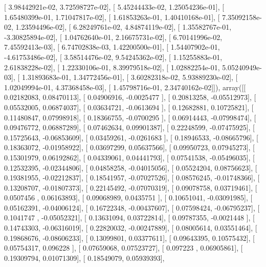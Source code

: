 \documentclass{article}
\begin{document}
       [  3.98442921e-02,   3.72598727e-02],
       [  5.45244433e-02,   1.25054236e-01],
       [  1.65480399e-01,   1.71047817e-02],
       [  1.61853263e-01,   1.40410168e-01],
       [  7.35092158e-02,   1.23594496e-02],
       [  6.28249761e-02,   4.84874119e-02],
       [  1.35582767e-01,  -3.30825894e-02],
       [  1.04762640e-01,   2.16675731e-02],
       [  6.70141996e-02,   7.45592413e-03],
       [  6.74702838e-03,   1.42200500e-01],
       [  1.54407902e-01,  -4.61753486e-02],
       [  3.58514476e-02,   9.54245362e-02],
       [  1.15255883e-01,   2.61838228e-02],
       [  1.22330106e-01,   8.39979518e-02],
       [  1.02882254e-01,   5.05240949e-03],
       [  1.31893683e-01,   1.34772456e-01],
       [  3.60282318e-02,   5.93889230e-02],
       [  1.02049994e-01,   4.37368458e-03],
       [  1.45798716e-01,   2.34740162e-02]]), array([[ 0.02182083,  0.08470113],
       [ 0.04906916, -0.0025477 ],
       [ 0.20813258, -0.05512973],
       [ 0.05532005,  0.06874037],
       [ 0.03634721, -0.0613694 ],
       [ 0.12682881,  0.10725821],
       [ 0.11480847,  0.07998918],
       [ 0.18366755, -0.0700295 ],
       [ 0.06914443, -0.07998474],
       [ 0.09476772,  0.06887289],
       [ 0.07462634,  0.09901387],
       [ 0.22248599, -0.07475925],
       [ 0.15725643, -0.06853609],
       [ 0.03459261, -0.0261683 ],
       [ 0.18946533, -0.08665796],
       [ 0.18363072, -0.01958922],
       [ 0.03697299,  0.05637566],
       [ 0.09950723,  0.07945273],
       [ 0.15301979,  0.06192862],
       [ 0.04339061,  0.04441793],
       [ 0.07541538, -0.05496035],
       [ 0.12532395, -0.02344806],
       [ 0.04858258, -0.04015056],
       [ 0.05524204,  0.08756623],
       [ 0.19381955, -0.02212837],
       [ 0.18541957, -0.07027526],
       [ 0.08576245, -0.01748366],
       [ 0.13208707, -0.01807373],
       [ 0.22145492, -0.07070319],
       [ 0.09078758,  0.03719461],
       [ 0.0507456 ,  0.06163893],
       [ 0.09068989,  0.0435751 ],
       [ 0.10651041, -0.03091985],
       [ 0.05162391, -0.04006124],
       [ 0.16722348, -0.00437607],
       [ 0.07598424, -0.06795237],
       [ 0.1041747 , -0.05052321],
       [ 0.13631094,  0.03722814],
       [ 0.09787355, -0.0021448 ],
       [ 0.14743303, -0.06316019],
       [ 0.22820032, -0.00247889],
       [ 0.08005614,  0.03551464],
       [ 0.19868676, -0.08606233],
       [ 0.13099801,  0.03377611],
       [ 0.09643395,  0.10575432],
       [ 0.05754317,  0.096228  ],
       [ 0.07659068,  0.07523727],
       [ 0.097223  ,  0.06905861],
       [ 0.19309794,  0.01071309],
       [ 0.18549079,  0.05939393],
\end{document}
